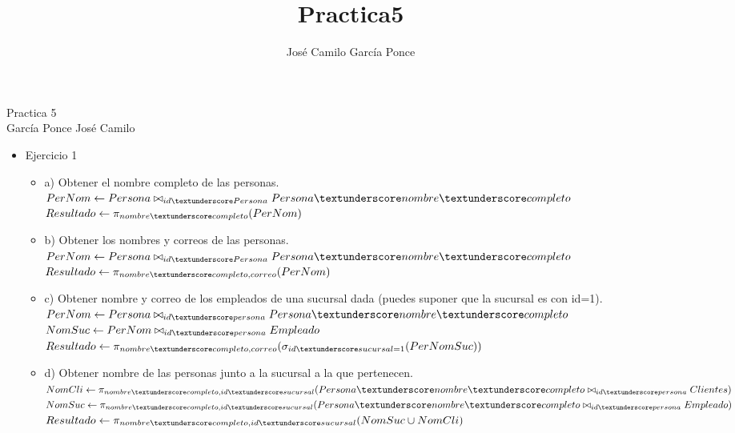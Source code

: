 \documentclass{article}
\title{Practica5}
\author{José Camilo García Ponce}
\begin{document}
Practica 5 \\
García Ponce José Camilo \\

\begin{itemize}
    \item Ejercicio 1
    \begin{itemize}
        \item a) Obtener el nombre completo de las personas. \\
        $PerNom \leftarrow Persona \bowtie_{id\textunderscore Persona} Persona\textunderscore nombre\textunderscore completo$ \\
        $Resultado \leftarrow \pi_{nombre\textunderscore completo} (PerNom)$ \\

        \item b) Obtener los nombres y correos de las personas. \\
        $PerNom \leftarrow Persona \bowtie_{id\textunderscore Persona} Persona\textunderscore nombre\textunderscore completo$ \\
        $Resultado \leftarrow \pi_{nombre\textunderscore completo, correo} (PerNom)$ \\

        \item c) Obtener nombre y correo de los empleados de una sucursal dada (puedes suponer que la sucursal es con id=1). \\
        $PerNom \leftarrow Persona \bowtie_{id\textunderscore persona} Persona\textunderscore nombre\textunderscore completo$ \\
        $NomSuc \leftarrow PerNom \bowtie_{id\textunderscore persona} Empleado$ \\
        $Resultado \leftarrow \pi_{nombre\textunderscore completo, correo} (\sigma_{id\textunderscore sucursal = 1}(PerNomSuc))$ \\

        \item d) Obtener nombre de las personas junto a la sucursal a la que pertenecen. \\
        $NomCli \leftarrow \pi_{nombre\textunderscore completo, id\textunderscore sucursal} (Persona\textunderscore nombre\textunderscore completo \bowtie_{id\textunderscore persona} Clientes)$ \\
        $NomSuc \leftarrow \pi_{nombre\textunderscore completo, id\textunderscore sucursal} (Persona\textunderscore nombre\textunderscore completo \bowtie_{id\textunderscore persona} Empleado)$ \\
        $Resultado \leftarrow  \pi_{nombre\textunderscore completo, id\textunderscore sucursal} (NomSuc \cup NomCli)$ \\


\end{itemize}
\end{itemize}
\end{document}
